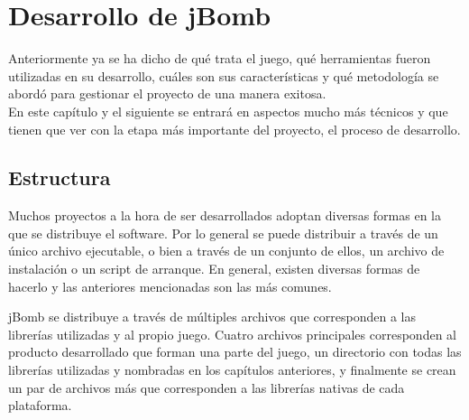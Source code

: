 \documentclass[a4paper,12pt,openany,oneside]{book}
\begin{document}
\chapter{Desarrollo de jBomb}
Anteriormente ya se ha dicho de qué trata el juego, qué herramientas fueron utilizadas en su desarrollo, cuáles son sus características y qué metodología se abordó para gestionar el proyecto de una manera exitosa.\\
En este capítulo y el siguiente se entrará en aspectos mucho más técnicos y que tienen que ver con la etapa más importante del proyecto, el proceso de desarrollo.

\section{Estructura}
Muchos proyectos a la hora de ser desarrollados adoptan diversas formas en la que se distribuye el software. Por lo general se puede distribuir a través de un único archivo ejecutable, o bien a través de un conjunto de ellos, un archivo de instalación o un script de arranque. En general, existen diversas formas de hacerlo y las anteriores mencionadas son las más comunes. 

jBomb se distribuye a través de múltiples archivos que corresponden a las librerías utilizadas y al propio juego. Cuatro archivos principales corresponden al producto desarrollado que forman una parte del juego, un directorio con todas las librerías utilizadas y nombradas en los capítulos anteriores, y finalmente se crean un par de archivos más que corresponden a las librerías nativas de cada plataforma.
\end{document}
